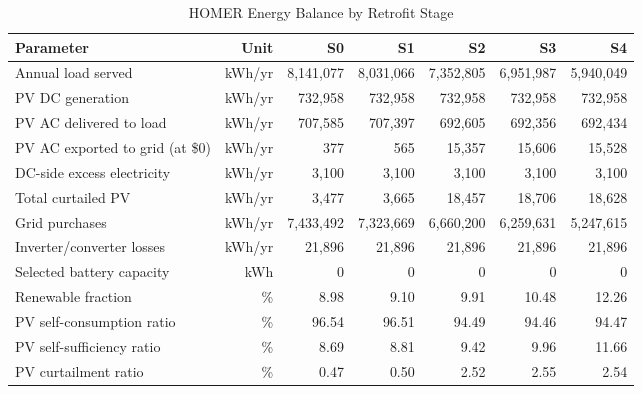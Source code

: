 \documentclass[journal,fleqn]{IEEEtran}
\renewcommand{\arraystretch}{1.08}
\begin{document}
\begin{table}[!t]
\caption{HOMER Energy Balance by Retrofit Stage}
\label{tab:10}
\centering
\scriptsize
\setlength{\tabcolsep}{4pt}
\renewcommand{\arraystretch}{1.16}
\begin{adjustbox}{max width=\textwidth}
\begin{tabular}{@{}lrrrrrr@{}}
\toprule
\textbf{Parameter} & \textbf{Unit} & \textbf{S0} & \textbf{S1} & \textbf{S2} & \textbf{S3} & \textbf{S4} \\
\midrule
Annual load served & kWh/yr & 8,141,077 & 8,031,066 & 7,352,805 & 6,951,987 & 5,940,049 \\
PV DC generation & kWh/yr & 732,958 & 732,958 & 732,958 & 732,958 & 732,958 \\
PV AC delivered to load & kWh/yr & 707,585 & 707,397 & 692,605 & 692,356 & 692,434 \\
PV AC exported to grid (at \$0) & kWh/yr & 377 & 565 & 15,357 & 15,606 & 15,528 \\
DC-side excess electricity & kWh/yr & 3,100 & 3,100 & 3,100 & 3,100 & 3,100 \\
Total curtailed PV & kWh/yr & 3,477 & 3,665 & 18,457 & 18,706 & 18,628 \\
Grid purchases & kWh/yr & 7,433,492 & 7,323,669 & 6,660,200 & 6,259,631 & 5,247,615 \\
Inverter/converter losses & kWh/yr & 21,896 & 21,896 & 21,896 & 21,896 & 21,896 \\
Selected battery capacity & kWh & 0 & 0 & 0 & 0 & 0 \\
Renewable fraction & \% & 8.98 & 9.10 & 9.91 & 10.48 & 12.26 \\
PV self-consumption ratio & \% & 96.54 & 96.51 & 94.49 & 94.46 & 94.47 \\
PV self-sufficiency ratio & \% & 8.69 & 8.81 & 9.42 & 9.96 & 11.66 \\
PV curtailment ratio & \% & 0.47 & 0.50 & 2.52 & 2.55 & 2.54 \\
\bottomrule
\end{tabular}
\end{adjustbox}
\end{table}

\par
\end{document}
